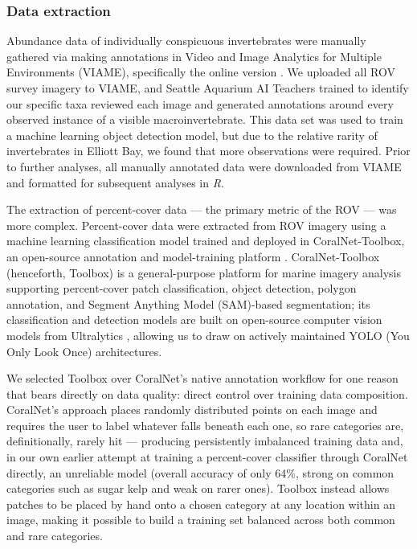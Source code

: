 \documentclass[11pt]{article}
\begin{document}
\subsubsection{Data extraction}
\label{subsec:data_extraction}

Abundance data of individually conspicuous invertebrates were manually gathered 
via making annotations in Video and Image Analytics for Multiple Environments 
(VIAME), specifically the online version \citep{dawkins2017viame,viame_web}.
We uploaded all ROV survey imagery to VIAME, and Seattle Aquarium AI Teachers 
trained to identify our specific taxa reviewed each image and generated 
annotations around every observed instance of a visible macroinvertebrate. 
This data set was used to train a machine learning object detection model, but 
due to the relative rarity of invertebrates in Elliott Bay, we found that more 
observations were required. 
Prior to further analyses, all manually annotated data were downloaded from 
VIAME and formatted for subsequent analyses in \textit{R}. 

The extraction of percent-cover data --- the primary metric of the ROV --- was 
more complex.
Percent-cover data were extracted from ROV imagery using a machine learning 
classification model trained and deployed in CoralNet-Toolbox, an open-source 
annotation and model-training platform \citep{Pierce:2025aa}.
CoralNet-Toolbox (henceforth, Toolbox) is a general-purpose platform for
marine imagery analysis supporting percent-cover patch classification, object
detection, polygon annotation, and Segment Anything Model (SAM)-based
segmentation; its classification and detection models are built on
open-source computer vision models from Ultralytics \citep{Jocher:2024aa},
allowing us to draw on actively maintained YOLO (You Only Look Once)
architectures.

We selected Toolbox over CoralNet's native annotation workflow for one reason
that bears directly on data quality: direct control over training data
composition.
CoralNet's approach places randomly distributed points on each image and
requires the user to label whatever falls beneath each one, so rare categories
are, definitionally, rarely hit --- producing persistently imbalanced training
data and, in our own earlier attempt at training a percent-cover classifier
through CoralNet directly, an unreliable model (overall accuracy of only
64\%, strong on common categories such as sugar kelp and weak on rarer ones).
Toolbox instead allows patches to be placed by hand onto a chosen category at
any location within an image, making it possible to build a training set
balanced across both common and rare categories.
\end{document}
